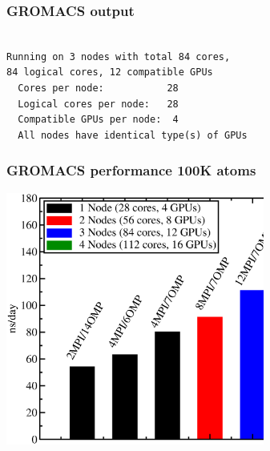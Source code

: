 \begin{frame}[fragile]
	\frametitle{GROMACS output}
  
        \begin{verbatim}             
    
Running on 3 nodes with total 84 cores, 
84 logical cores, 12 compatible GPUs
  Cores per node:           28                                          
  Logical cores per node:   28                 
  Compatible GPUs per node:  4                 
  All nodes have identical type(s) of GPUs  

        \end{verbatim}

\end{frame}
\begin{frame}
	\frametitle{GROMACS performance 100K atoms}
        \begin{center}
		\includegraphics[width=8.5cm]{images/data_kebne.eps}
        \end{center}
\end{frame}

